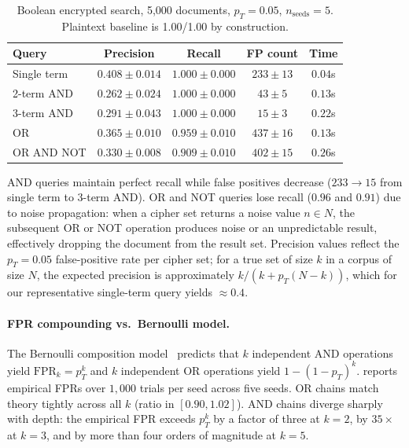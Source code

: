 \documentclass[11pt]{article}
\theoremstyle{definition}
\theoremstyle{plain}
\theoremstyle{remark}
\begin{document}
\begin{table}[ht]
\centering
\small
\caption{Boolean encrypted search, 5{,}000 documents, $p_T = 0.05$,
$n_\text{seeds} = 5$. Plaintext baseline is 1.00/1.00 by construction.}
\label{tab:boolean-search}
\begin{tabular}{@{}lcccc@{}}
\toprule
Query & Precision & Recall & FP count & Time \\
\midrule
Single term & $0.408 \pm 0.014$ & $1.000 \pm 0.000$ & $233 \pm 13$ & $0.04$s \\
2-term AND & $0.262 \pm 0.024$ & $1.000 \pm 0.000$ & $43 \pm 5$ & $0.13$s \\
3-term AND & $0.291 \pm 0.043$ & $1.000 \pm 0.000$ & $15 \pm 3$ & $0.22$s \\
OR & $0.365 \pm 0.010$ & $0.959 \pm 0.010$ & $437 \pm 16$ & $0.13$s \\
OR AND NOT & $0.330 \pm 0.008$ & $0.909 \pm 0.010$ & $402 \pm 15$ & $0.26$s \\
\bottomrule
\end{tabular}
\end{table}

AND queries maintain perfect recall while false positives decrease
($233 \to 15$ from single term to 3-term AND).
OR and NOT queries lose recall ($0.96$ and $0.91$) due to noise
propagation: when a cipher set returns a noise value $n \in N$,
the subsequent OR or NOT operation produces noise or an unpredictable
result, effectively dropping the document from the result set.
Precision values reflect the $p_T = 0.05$ false-positive rate per
cipher set; for a true set of size $k$ in a corpus of size $N$, the
expected precision is approximately $k / (k + p_T (N - k))$, which
for our representative single-term query yields $\approx 0.4$.

\paragraph{FPR compounding vs.\ Bernoulli model.}
The Bernoulli composition model~\cite{towell2026bernoulli} predicts
that $k$ independent AND operations yield $\mathrm{FPR}_k = p_T^k$
and $k$ independent OR operations yield $1 - (1 - p_T)^k$.
 reports empirical FPRs over $1{,}000$
trials per seed across five seeds.
OR chains match theory tightly across all $k$ (ratio in
$[0.90, 1.02]$).
AND chains diverge sharply with depth: the empirical FPR exceeds
$p_T^k$ by a factor of three at $k = 2$, by $35\times$ at $k = 3$,
and by more than four orders of magnitude at $k = 5$.
\end{document}
